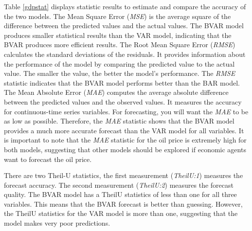 \documentclass[11pt,preprint, authoryear]{elsarticle}
\numberwithin{equation}{section}
\numberwithin{figure}{section}
\numberwithin{table}{section}
\begin{document}
Table \ref{gdpstat} displays statistic results to estimate and compare
the accuracy of the two models. The Mean Square Error (\emph{MSE}) is
the average square of the difference between the predicted values and
the actual values. The BVAR model produces smaller statistical results
than the VAR model, indicating that the BVAR produces more efficient
results. The Root Mean Square Error (\emph{RMSE}) calculates the
standard deviations of the residuals. It provides information about the
performance of the model by comparing the predicted value to the actual
value. The smaller the value, the better the model's performance. The
\emph{RMSE} statistic indicates that the BVAR model performs better than
the BAR model. The Mean Absolute Error (\emph{MAE}) computes the average
absolute difference between the predicted values and the observed
values. It measures the accuracy for continuous-time series variables.
For forecasting, you will want the \emph{MAE} to be as low as possible.
Therefore, the \emph{MAE} statistic shows that the BVAR model provides a
much more accurate forecast than the VAR model for all variables. It is
important to note that the \emph{MAE} statistic for the oil price is
extremely high for both models, suggesting that other models should be
explored if economic agents want to forecast the oil price.

There are two Theil-U statistics, the first measurement
(\emph{TheilU:1}) measures the forecast accuracy. The second measurement
(\emph{TheilU:2}) measures the forecast quality. The BVAR model has a
TheilU statistics of less than one for all three variables. This means
that the BVAR forecast is better than guessing. However, the TheilU
statistics for the VAR model is more than one, suggesting that the model
makes very poor predictions.
\end{document}
